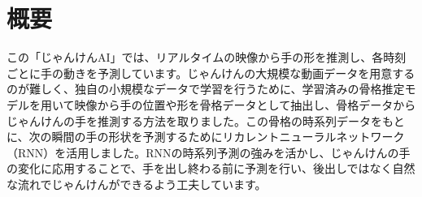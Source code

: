 


% 
\section{概要}
この「じゃんけんAI」では、リアルタイムの映像から手の形を推測し、各時刻ごとに手の動きを予測しています。じゃんけんの大規模な動画データを用意するのが難しく、独自の小規模なデータで学習を行うために、学習済みの骨格推定モデルを用いて映像から手の位置や形を骨格データとして抽出し、骨格データからじゃんけんの手を推測する方法を取りました。この骨格の時系列データをもとに、次の瞬間の手の形状を予測するためにリカレントニューラルネットワーク（RNN）を活用しました。RNNの時系列予測の強みを活かし、じゃんけんの手の変化に応用することで、手を出し終わる前に予測を行い、後出しではなく自然な流れでじゃんけんができるよう工夫しています。

